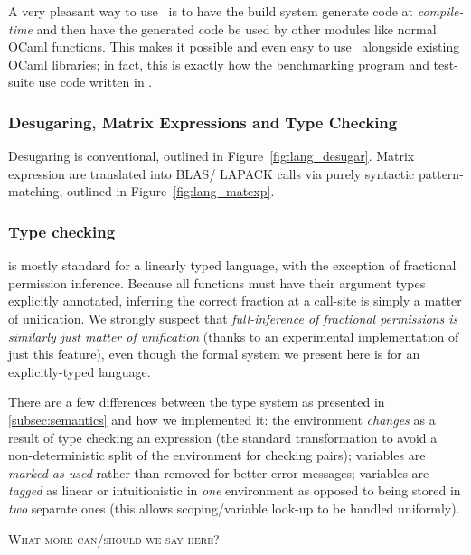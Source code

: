 A very pleasant way to use \lang\ is to have the build system generate code at
\emph{compile-time} and then have the generated code be used by other modules
like normal OCaml functions. This makes it possible and even easy to use \lang\
alongside existing OCaml libraries; in fact, this is exactly how the
benchmarking program and test-suite use code written in \lang.

\subsubsection{Desugaring, Matrix Expressions and Type Checking}\label{subsubsec:initial}

Desugaring is conventional, outlined in Figure~\ref{fig:lang_desugar}.  Matrix
expression are translated into BLAS/ LAPACK calls via purely syntactic
pattern-matching, outlined in Figure~\ref{fig:lang_matexp}.

\subsubsection{Type checking} is mostly standard for a linearly typed language,
with the exception of fractional permission inference. Because all functions
must have their argument types explicitly annotated, inferring the correct
fraction at a call-site is simply a matter of unification. We strongly suspect
that \emph{full-inference of fractional permissions is similarly just matter of
unification} (thanks to an experimental implementation of just this feature),
even though the formal system we present here is for an explicitly-typed
language.

There are a few differences between the type system as presented in
\ref{subsec:semantics} and how we implemented it: the environment
\emph{changes} as a result of type checking an expression (the standard
transformation to avoid a non-deterministic split of the environment for
checking pairs); variables are \emph{marked as used} rather than removed for
better error messages; variables are \emph{tagged} as linear or intuitionistic
in \emph{one} environment as opposed to being stored in \emph{two} separate
ones (this allows scoping/variable look-up to be handled uniformly).

\textsc{What more can/should we say here?}

